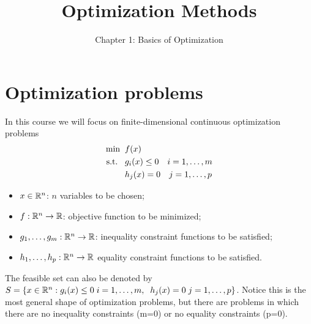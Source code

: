 \documentclass[10pt,a4paper]{article}
\title{Optimization Methods}
\author{Chapter 1: Basics of Optimization}
\date{}
\begin{document}
	\maketitle
	\section{Optimization problems}
	In this course we will focus on finite-dimensional continuous optimization problems
	\begin{equation}\label{eq:problem}
	\begin{split}
		\min \;\; &f(x)\\
		\text{s.t.} \;\;\;&g_i(x) \leq 0 \quad i=1, \dots, m\\
		& h_j(x) = 0 \quad j=1, \dots, p
	\end{split}
	\end{equation}
\begin{itemize}
	\item $x \in \mathbb{R}^n$: $n$ variables to be chosen;
	\item $f: \mathbb{R}^n\to \mathbb{R}$: objective function to be minimized;
	\item $g_1,\dots, g_m: \mathbb{R}^n \to \mathbb{R}$: inequality constraint functions to be satisfied;
	\item $h_1,\dots, h_p: \mathbb{R}^n \to \mathbb{R}$ equality constraint functions to be satisfied.
\end{itemize}
The feasible set can also be denoted by $S=\{x \in \mathbb{R}^n: g_i(x) \leq 0 \; i=1, \dots, m, \;\; h_j(x) = 0 \; j=1, \dots, p\}$. Notice this is the most general shape of optimization problems, but there are problems in which there are no inequality constraints (m=0) or no equality constraints (p=0).
\end{document}

